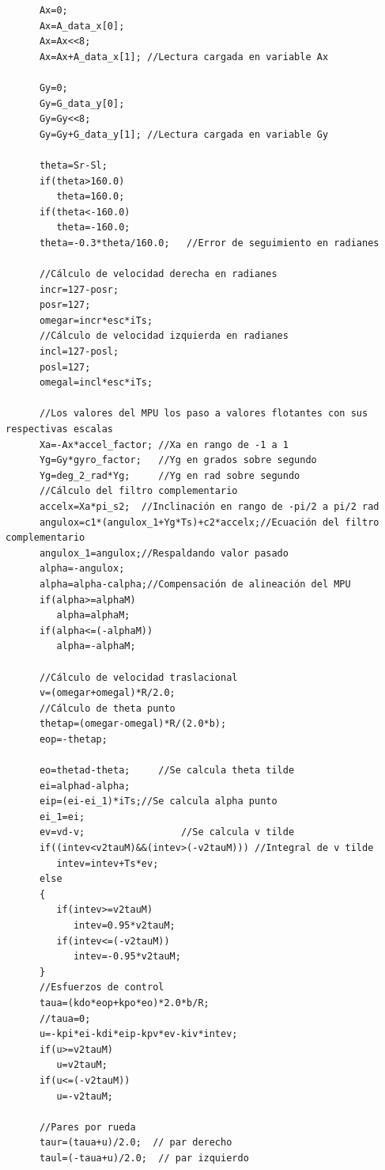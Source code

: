 \documentclass{article}
\begin{document}
{\begin{verbatim}
      Ax=0;
      Ax=A_data_x[0];
      Ax=Ax<<8;
      Ax=Ax+A_data_x[1]; //Lectura cargada en variable Ax
      
      Gy=0;
      Gy=G_data_y[0];
      Gy=Gy<<8;
      Gy=Gy+G_data_y[1]; //Lectura cargada en variable Gy
      
      theta=Sr-Sl;
      if(theta>160.0)
         theta=160.0;
      if(theta<-160.0)
         theta=-160.0;
      theta=-0.3*theta/160.0;   //Error de seguimiento en radianes  
      
      //Cálculo de velocidad derecha en radianes
      incr=127-posr;
      posr=127;
      omegar=incr*esc*iTs;
      //Cálculo de velocidad izquierda en radianes
      incl=127-posl;
      posl=127;
      omegal=incl*esc*iTs;
      
      //Los valores del MPU los paso a valores flotantes con sus respectivas escalas
      Xa=-Ax*accel_factor; //Xa en rango de -1 a 1
      Yg=Gy*gyro_factor;   //Yg en grados sobre segundo
      Yg=deg_2_rad*Yg;     //Yg en rad sobre segundo 
      //Cálculo del filtro complementario
      accelx=Xa*pi_s2;  //Inclinación en rango de -pi/2 a pi/2 rad
      angulox=c1*(angulox_1+Yg*Ts)+c2*accelx;//Ecuación del filtro complementario
      angulox_1=angulox;//Respaldando valor pasado
      alpha=-angulox;
      alpha=alpha-calpha;//Compensación de alineación del MPU
      if(alpha>=alphaM)
         alpha=alphaM;
      if(alpha<=(-alphaM))
         alpha=-alphaM;

      //Cálculo de velocidad traslacional
      v=(omegar+omegal)*R/2.0;   
      //Cálculo de theta punto
      thetap=(omegar-omegal)*R/(2.0*b);
      eop=-thetap;
               
      eo=thetad-theta;     //Se calcula theta tilde
      ei=alphad-alpha;
      eip=(ei-ei_1)*iTs;//Se calcula alpha punto
      ei_1=ei;
      ev=vd-v;                 //Se calcula v tilde
      if((intev<v2tauM)&&(intev>(-v2tauM))) //Integral de v tilde
         intev=intev+Ts*ev;
      else
      {
         if(intev>=v2tauM)
            intev=0.95*v2tauM;
         if(intev<=(-v2tauM))
            intev=-0.95*v2tauM; 
      }
      //Esfuerzos de control   
      taua=(kdo*eop+kpo*eo)*2.0*b/R;
      //taua=0;
      u=-kpi*ei-kdi*eip-kpv*ev-kiv*intev;
      if(u>=v2tauM)
         u=v2tauM;
      if(u<=(-v2tauM))
         u=-v2tauM; 
                           
      //Pares por rueda      
      taur=(taua+u)/2.0;  // par derecho
      taul=(-taua+u)/2.0;  // par izquierdo
                           

\end{verbatim}}
\end{document}
